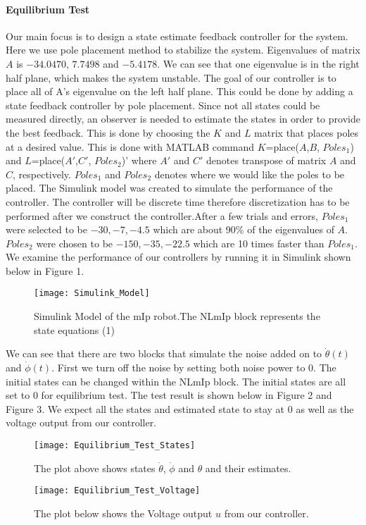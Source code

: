 \documentclass{article}
\begin{document}
\paragraph{Equilibrium Test}
Our main focus is to design a state estimate feedback controller for the system. Here we use pole placement method to stabilize the system. Eigenvalues of matrix $A$ is $-34.0470$, $7.7498$ and $-5.4178$. We can see that one eigenvalue is in the right half plane, which makes the system unstable. The goal of our controller is to place all of A's eigenvalue on the left half plane. This could be done by adding a state feedback controller by pole placement. Since not all states could be measured directly, an observer is needed to estimate the states in order to provide the best feedback. This is done by choosing the $K$ and $L$ matrix that places poles at a desired value. This is done with MATLAB command $K$=place($A$,$B$, $Poles_1$) and $L$=place($A'$,$C'$, $Poles_2$)' where $A'$ and $C'$ denotes transpose of matrix $A$ and $C$, respectively. $Poles_1$ and $Poles_2$ denotes where we would like the poles to be placed. The Simulink model was created to simulate the performance of the controller. The controller will be discrete time therefore discretization has to be performed after we construct the controller.After a few trials and errors, $Poles_1$ were selected to be ${-30,-7,-4.5}$ which are about 90\% of the eigenvalues of $A$. $Poles_2$ were chosen to be ${-150,-35,-22.5}$ which are 10 times faster than $Poles_1$. We examine the performance of our controllers by running it in Simulink shown below in Figure 1. 
\begin{figure}[h!]
\texttt{[image: Simulink\_Model]}
\centering
\caption{Simulink Model of the mIp robot.The NLmIp block represents the state equations (1)}
\centering
\end{figure} 
We can see that there are two blocks that simulate the noise added on to $\dot{\theta}(t)$ and $\dot{\phi}(t)$. First we turn off the noise by setting both noise power to 0. The initial states can be changed within the NLmIp block. The initial states are all set to 0 for equilibrium test. The test result is shown below in Figure 2 and Figure 3. We expect all the states and estimated state to stay at 0 as well as the voltage output from our controller.
\begin{figure}[h!]
\texttt{[image: Equilibrium\_Test\_States]}
\centering
\caption{The plot above shows states $\dot{\theta}$, $\dot{\phi}$ and $\theta$ and their estimates.}
\end{figure}
\begin{figure}[h!]
\texttt{[image: Equilibrium\_Test\_Voltage]}
\centering
\caption{The plot below shows the Voltage output $u$ from our controller.}	
\end{figure}
\end{document}
